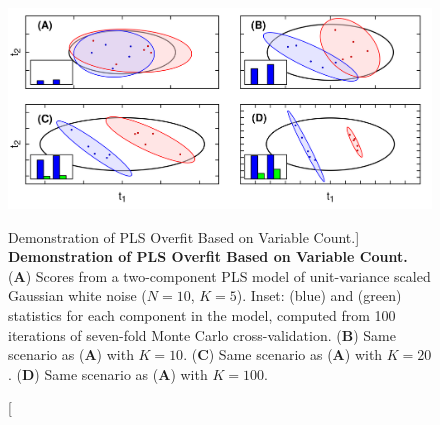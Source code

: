 \begin{figure}[ht!]
\includegraphics[width=6.5in]{figs/mva/15-overfit.png}
\caption
      [Demonstration of PLS Overfit Based on Variable Count.]{
  {\bf Demonstration of PLS Overfit Based on Variable Count.}
  \\
  ({\bf A}) Scores from a two-component PLS model of unit-variance scaled
  Gaussian white noise ($N = 10$, $K = 5$). Inset: \rsqy{} (blue) and \qsq{}
  (green) statistics for each component in the model, computed from 100
  iterations of seven-fold Monte Carlo cross-validation.
  ({\bf B}) Same scenario as ({\bf A}) with $K = 10$.
  ({\bf C}) Same scenario as ({\bf A}) with $K = 20$.
  ({\bf D}) Same scenario as ({\bf A}) with $K = 100$.
}
\label{figure.3.15}
\end{figure}

